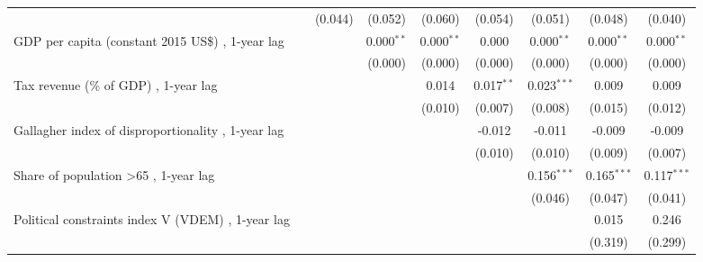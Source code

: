 \begin{table}[htbp]
\begin{tabular}{lcccccccc}
                                                                                 &               & (0.044)       & (0.052)        & (0.060)       & (0.054)       & (0.051)        & (0.048)       & (0.040)\\   
      GDP per capita (constant 2015 US\$) , 1-year lag                           &               &               & 0.000$^{**}$   & 0.000$^{**}$  & 0.000         & 0.000$^{**}$   & 0.000$^{**}$  & 0.000$^{**}$\\   
                                                                                 &               &               & (0.000)        & (0.000)       & (0.000)       & (0.000)        & (0.000)       & (0.000)\\   
      Tax revenue (\% of GDP) , 1-year lag                                       &               &               &                & 0.014         & 0.017$^{**}$  & 0.023$^{***}$  & 0.009         & 0.009\\   
                                                                                 &               &               &                & (0.010)       & (0.007)       & (0.008)        & (0.015)       & (0.012)\\   
      Gallagher index of disproportionality , 1-year lag                         &               &               &                &               & -0.012        & -0.011         & -0.009        & -0.009\\   
                                                                                 &               &               &                &               & (0.010)       & (0.010)        & (0.009)       & (0.007)\\   
      Share of population >65 , 1-year lag                                       &               &               &                &               &               & 0.156$^{***}$  & 0.165$^{***}$ & 0.117$^{***}$\\   
                                                                                 &               &               &                &               &               & (0.046)        & (0.047)       & (0.041)\\   
      Political constraints index V (VDEM) , 1-year lag                          &               &               &                &               &               &                & 0.015         & 0.246\\   
                                                                                 &               &               &                &               &               &                & (0.319)       & (0.299)\\   

\end{tabular}
\end{table}
